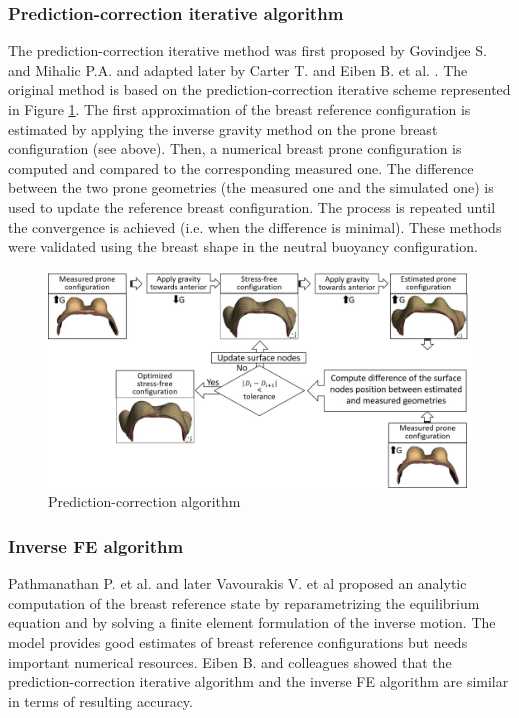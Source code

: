  \subsubsection*{Prediction-correction iterative algorithm}
 The prediction-correction iterative method was first proposed by Govindjee S. and Mihalic P.A. \citep{govindjee_computational_1998} and adapted later by Carter T. \citep{carter_biomechanical_2009} and Eiben B. et al. \citep{eiben_breast_2014}. The original method is based on the prediction-correction iterative scheme represented in Figure \ref{predictioncorectionalgo}. The first approximation of the breast reference configuration is estimated by applying the inverse gravity method on the prone breast configuration (see above).  Then, a numerical breast prone configuration is computed and compared to the corresponding measured one. The difference between the two prone geometries (the measured one and the simulated one) is used to update the reference breast configuration. The process is repeated until the convergence is achieved (i.e. when the difference is minimal). These methods were validated using the breast shape in the neutral buoyancy configuration.

\begin{figure}[!h]
\centering
\includegraphics[width=1\textwidth,keepaspectratio]{figures/prediction-correction.jpg} 
\caption{Prediction-correction algorithm}\label{predictioncorectionalgo}
\end{figure}


 \subsubsection*{Inverse FE algorithm}
Pathmanathan P. et al. \citep{pathmanathan_predicting_2008} and later Vavourakis V. et al \citep{vavourakis_inverse_2016} proposed an analytic computation of the breast reference state by reparametrizing the equilibrium equation and by solving a finite element formulation of the inverse motion. The model provides good estimates of breast reference configurations but needs important numerical resources. Eiben B. and colleagues \citep{eiben_breast_2014} showed that the prediction-correction iterative algorithm and the inverse FE algorithm are similar in terms of resulting accuracy. 

